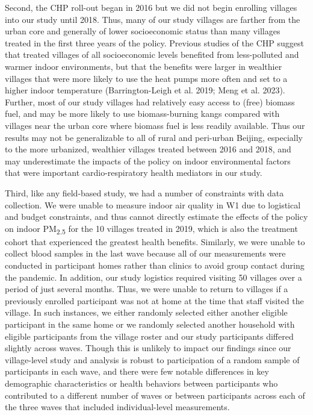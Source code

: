 \documentclass[
  letterpaper,
  DIV=11,
  numbers=noendperiod]{scrartcl}
\begin{document}
Second, the CHP roll-out began in 2016 but we did not begin enrolling
villages into our study until 2018. Thus, many of our study villages are
farther from the urban core and generally of lower socioeconomic status
than many villages treated in the first three years of the policy.
Previous studies of the CHP suggest that treated villages of all
socioeconomic levels benefited from less-polluted and warmer indoor
environments, but that the benefits were larger in wealthier villages
that were more likely to use the heat pumps more often and set to a
higher indoor temperature (Barrington-Leigh et al. 2019; Meng et al.
2023). Further, most of our study villages had relatively easy access to
(free) biomass fuel, and may be more likely to use biomass-burning kangs
compared with villages near the urban core where biomass fuel is less
readily available. Thus our results may not be generalizable to all of
rural and peri-urban Beijing, especially to the more urbanized,
wealthier villages treated between 2016 and 2018, and may underestimate
the impacts of the policy on indoor environmental factors that were
important cardio-respiratory health mediators in our study.

Third, like any field-based study, we had a number of constraints with
data collection. We were unable to measure indoor air quality in W1 due
to logistical and budget constraints, and thus cannot directly estimate
the effects of the policy on indoor PM\textsubscript{2.5} for the 10
villages treated in 2019, which is also the treatment cohort that
experienced the greatest health benefits. Similarly, we were unable to
collect blood samples in the last wave because all of our measurements
were conducted in participant homes rather than clinics to avoid group
contact during the pandemic. In addition, our study logistics required
visiting 50 villages over a period of just several months. Thus, we were
unable to return to villages if a previously enrolled participant was
not at home at the time that staff visited the village. In such
instances, we either randomly selected either another eligible
participant in the same home or we randomly selected another household
with eligible participants from the village roster and our study
participants differed slightly across waves. Though this is unlikely to
impact our findings since our village-level study and analysis is robust
to participation of a random sample of participants in each wave, and
there were few notable differences in key demographic characteristics or
health behaviors between participants who contributed to a different
number of waves or between participants across each of the three waves
that included individual-level measurements.
\end{document}

